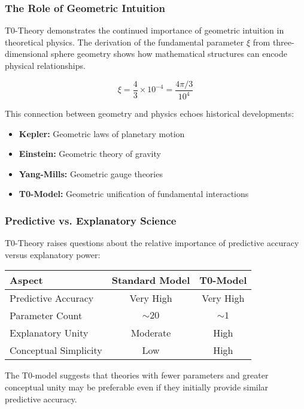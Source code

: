 \documentclass[12pt,a4paper]{article}
\theoremstyle{definition}
\begin{document}
	\subsubsection{The Role of Geometric Intuition}
	
	T0-Theory demonstrates the continued importance of geometric intuition in theoretical physics. The derivation of the fundamental parameter $\xi$ from three-dimensional sphere geometry shows how mathematical structures can encode physical relationships.
	
	\begin{equation}
		\xi = \frac{4}{3} \times 10^{-4} = \frac{4\pi/3}{10^4}
	\end{equation}
	
	This connection between geometry and physics echoes historical developments:
	\begin{itemize}
		\item \textbf{Kepler:} Geometric laws of planetary motion
		\item \textbf{Einstein:} Geometric theory of gravity
		\item \textbf{Yang-Mills:} Geometric gauge theories
		\item \textbf{T0-Model:} Geometric unification of fundamental interactions
	\end{itemize}
	
	\subsubsection{Predictive vs. Explanatory Science}
	
	T0-Theory raises questions about the relative importance of predictive accuracy versus explanatory power:
	
	\begin{center}
		\begin{tabular}{lcc}
			\toprule
			\textbf{Aspect} & \textbf{Standard Model} & \textbf{T0-Model} \\
			\midrule
			Predictive Accuracy & Very High & Very High \\
			Parameter Count & $\sim 20$ & $\sim 1$ \\
			Explanatory Unity & Moderate & High \\
			Conceptual Simplicity & Low & High \\
			\bottomrule
		\end{tabular}
	\end{center}
	
	The T0-model suggests that theories with fewer parameters and greater conceptual unity may be preferable even if they initially provide similar predictive accuracy.
	
\end{document}

